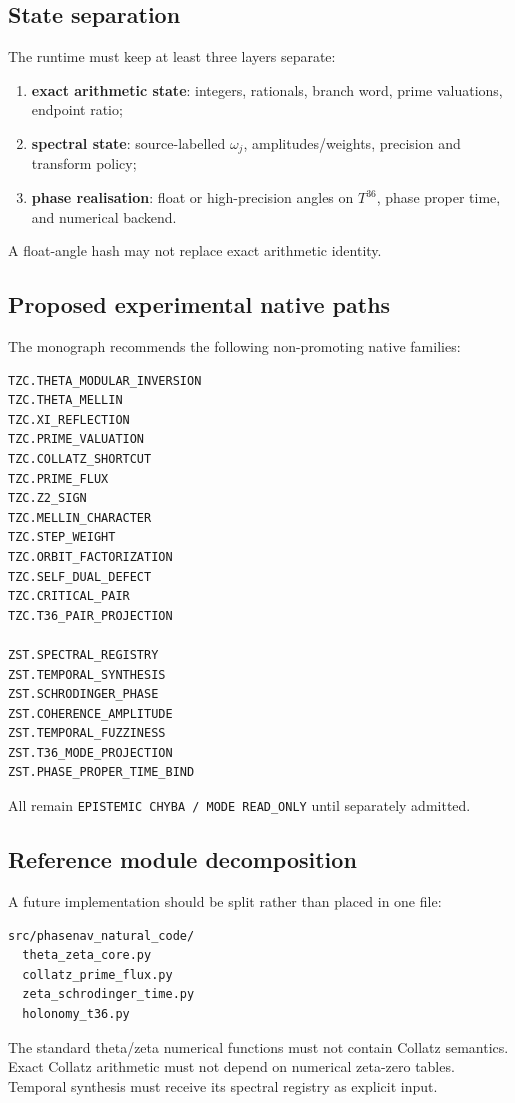\subsection{State separation}

The runtime must keep at least three layers separate:
\begin{enumerate}[leftmargin=2em]
\item \textbf{exact arithmetic state}: integers, rationals, branch word, prime valuations, endpoint ratio;
\item \textbf{spectral state}: source-labelled \(\omega_j\), amplitudes/weights, precision and transform policy;
\item \textbf{phase realisation}: float or high-precision angles on \(T^{36}\), phase proper time, and numerical backend.
\end{enumerate}
A float-angle hash may not replace exact arithmetic identity.

\subsection{Proposed experimental native paths}

The monograph recommends the following non-promoting native families:
\begin{lstlisting}[basicstyle=\ttfamily\small,frame=single,breaklines=true]
TZC.THETA_MODULAR_INVERSION
TZC.THETA_MELLIN
TZC.XI_REFLECTION
TZC.PRIME_VALUATION
TZC.COLLATZ_SHORTCUT
TZC.PRIME_FLUX
TZC.Z2_SIGN
TZC.MELLIN_CHARACTER
TZC.STEP_WEIGHT
TZC.ORBIT_FACTORIZATION
TZC.SELF_DUAL_DEFECT
TZC.CRITICAL_PAIR
TZC.T36_PAIR_PROJECTION

ZST.SPECTRAL_REGISTRY
ZST.TEMPORAL_SYNTHESIS
ZST.SCHRODINGER_PHASE
ZST.COHERENCE_AMPLITUDE
ZST.TEMPORAL_FUZZINESS
ZST.T36_MODE_PROJECTION
ZST.PHASE_PROPER_TIME_BIND
\end{lstlisting}
All remain \texttt{EPISTEMIC CHYBA / MODE READ\_ONLY} until separately admitted.

\subsection{Reference module decomposition}

A future implementation should be split rather than placed in one file:
\begin{lstlisting}[basicstyle=\ttfamily\small,frame=single,breaklines=true]
src/phasenav_natural_code/
  theta_zeta_core.py
  collatz_prime_flux.py
  zeta_schrodinger_time.py
  holonomy_t36.py
\end{lstlisting}
The standard theta/zeta numerical functions must not contain Collatz semantics. Exact Collatz arithmetic must not depend on numerical zeta-zero tables. Temporal synthesis must receive its spectral registry as explicit input.


